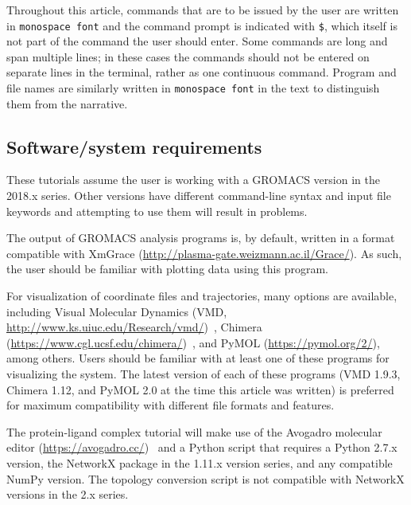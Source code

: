 \documentclass[9pt,tutorial]{livecoms}
\begin{document}
Throughout this article, commands that are to be issued by the user are written in \texttt{monospace font} and the command prompt is indicated with \texttt{\$}, which itself is not part of the command the user should enter. Some commands are long and span multiple lines; in these cases the commands should not be entered on separate lines in the terminal, rather as one continuous command. Program and file names are similarly written in \texttt{monospace font} in the text to distinguish them from the narrative.

\subsection{Software/system requirements}
These tutorials assume the user is working with a GROMACS version in the 2018.x series. Other versions have different command-line syntax and input file keywords and attempting to use them will result in problems.

The output of GROMACS analysis programs is, by default, written in a format compatible with XmGrace (\url{http://plasma-gate.weizmann.ac.il/Grace/}). As such, the user should be familiar with plotting data using this program.

For visualization of coordinate files and trajectories, many options are available, including Visual Molecular Dynamics (VMD, \url{http://www.ks.uiuc.edu/Research/vmd/})~\cite{Humphrey1996}, Chimera (\url{https://www.cgl.ucsf.edu/chimera/})~\cite{Petersen2004}, and PyMOL (\url{https://pymol.org/2/}), among others. Users should be familiar with at least one of these programs for visualizing the system. The latest version of each of these programs (VMD 1.9.3, Chimera 1.12, and PyMOL 2.0 at the time this article was written) is preferred for maximum compatibility with different file formats and features.

The protein-ligand complex tutorial will make use of the Avogadro molecular editor (\url{https://avogadro.cc/})~\cite{Hanwell2012} and a Python script that requires a Python 2.7.x version, the NetworkX package in the 1.11.x version series, and any compatible NumPy version. The topology conversion script is not compatible with NetworkX versions in the 2.x series.
\end{document}
